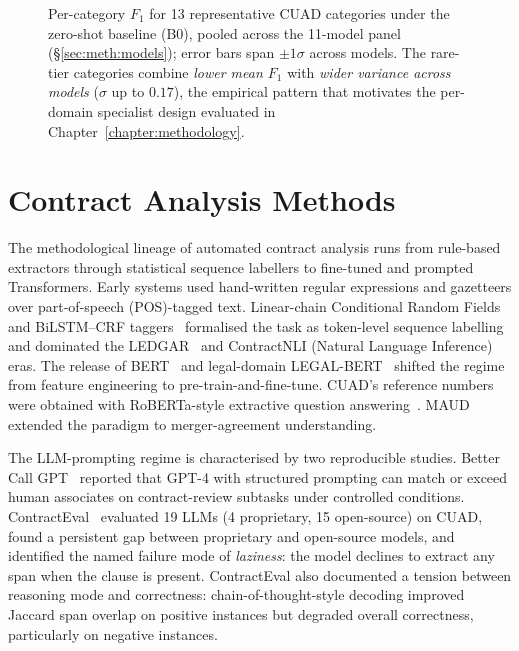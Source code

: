 \begin{figure}[h]
  \caption{Per-category $F_1$ for 13 representative CUAD categories under the
  zero-shot baseline (B0), pooled across the 11-model panel
  (\S\ref{sec:meth:models}); error bars span $\pm 1\sigma$ across models.
  The rare-tier categories combine \emph{lower mean $F_1$} with
  \emph{wider variance across models} ($\sigma$ up to $0.17$), the empirical
  pattern that motivates the per-domain specialist design evaluated in
  Chapter~\ref{chapter:methodology}.}
  \label{fig:cuad-tiers}
\end{figure}

\section{Contract Analysis Methods}\label{sec:lit:methods}

The methodological lineage of automated contract analysis runs from rule-based
extractors through statistical sequence labellers to fine-tuned and prompted
Transformers. Early systems used hand-written regular expressions and gazetteers over
part-of-speech (POS)-tagged text. Linear-chain Conditional Random Fields~\cite{lafferty2001crf} and
BiLSTM--CRF taggers~\cite{lample2016neural} formalised the task as token-level
sequence labelling and dominated the LEDGAR~\cite{tuggener2020ledgar} and
ContractNLI (Natural Language Inference)~\cite{koreeda2021contractnli} eras. The release of BERT~\cite{devlin2019bert}
and legal-domain LEGAL-BERT~\cite{chalkidis2020legalbert} shifted the regime from
feature engineering to pre-train-and-fine-tune. CUAD's reference numbers were obtained
with RoBERTa-style extractive question answering~\cite{hendrycks2021cuad}. MAUD~\cite{wang2023maud}
extended the paradigm to merger-agreement understanding.

The LLM-prompting regime is characterised by two reproducible studies.
Better Call GPT~\cite{martin2024bettercallgpt} reported that GPT-4 with structured
prompting can match or exceed human associates on contract-review subtasks under
controlled conditions. ContractEval~\cite{liu2025contracteval} evaluated 19 LLMs
(4 proprietary, 15 open-source) on CUAD, found a persistent gap between proprietary
and open-source models, and identified the named failure mode of \emph{laziness}:
the model declines to extract any span when the clause is present. ContractEval also
documented a tension between reasoning mode and correctness: chain-of-thought-style
decoding improved Jaccard span overlap on positive instances but degraded overall
correctness, particularly on negative instances.

